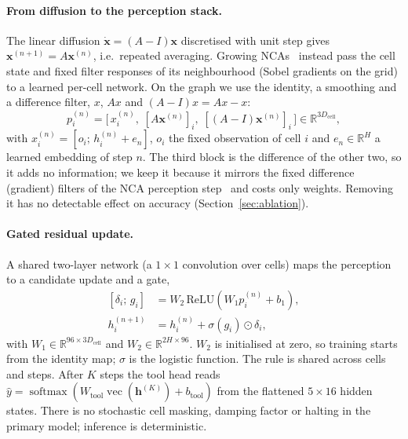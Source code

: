 \documentclass[10pt]{article}
\begin{document}
\paragraph{From diffusion to the perception stack.} The linear diffusion $\dot{\mathbf{x}} = (A-I)\mathbf{x}$ discretised with unit step gives $\mathbf{x}^{(n+1)} = A\mathbf{x}^{(n)}$, i.e.\ repeated averaging. Growing NCAs~\citep{mordvintsev2020growing} instead pass the cell state and fixed filter responses of its neighbourhood (Sobel gradients on the grid) to a learned per-cell network. On the graph we use the identity, a smoothing and a difference filter, $x$, $Ax$ and $(A-I)x = Ax - x$:
\begin{equation}\label{eq:perceive}
p_i^{(n)} = \bigl[\,x_i^{(n)},\; [A\mathbf{x}^{(n)}]_i,\; [(A-I)\mathbf{x}^{(n)}]_i\,\bigr] \in \mathbb{R}^{3D_{\text{cell}}},
\end{equation}
with $x_i^{(n)} = [o_i;\, h_i^{(n)} + e_n]$, $o_i$ the fixed observation of cell $i$ and $e_n\in\mathbb{R}^H$ a learned embedding of step $n$. The third block is the difference of the other two, so it adds no information; we keep it because it mirrors the fixed difference (gradient) filters of the NCA perception step~\citep{mordvintsev2020growing} and costs only weights. Removing it has no detectable effect on accuracy (Section~\ref{sec:ablation}).
\paragraph{Gated residual update.} A shared two-layer network (a $1\times1$ convolution over cells) maps the perception to a candidate update and a gate,
\begin{equation}\label{eq:update}
\begin{aligned}
[\delta_i;\, g_i] &= W_2\,\mathrm{ReLU}(W_1 p_i^{(n)} + b_1),\\
h_i^{(n+1)} &= h_i^{(n)} + \sigma(g_i) \odot \delta_i ,
\end{aligned}
\end{equation}
with $W_1\in\mathbb{R}^{96\times 3D_{\text{cell}}}$ and $W_2\in\mathbb{R}^{2H\times 96}$. $W_2$ is initialised at zero, so training starts from the identity map; $\sigma$ is the logistic function. The rule is shared across cells and steps. After $K$ steps the tool head reads $\hat y = \operatorname{softmax}(W_{\text{tool}}\operatorname{vec}(\mathbf{h}^{(K)}) + b_{\text{tool}})$ from the flattened $5\times16$ hidden states. There is no stochastic cell masking, damping factor or halting in the primary model; inference is deterministic.
\end{document}
